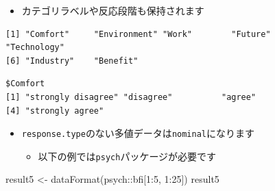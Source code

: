 \documentclass[
  a4paper,
]{ltjsbook}
\newenvironment{Shaded}{\begin{snugshade}}{\end{snugshade}}
\newcommand{\DecValTok}[1]{\textcolor[rgb]{0.68,0.00,0.00}{#1}}
\newcommand{\FunctionTok}[1]{\textcolor[rgb]{0.28,0.35,0.67}{#1}}
\newcommand{\NormalTok}[1]{\textcolor[rgb]{0.00,0.23,0.31}{#1}}
\newcommand{\OtherTok}[1]{\textcolor[rgb]{0.00,0.23,0.31}{#1}}
\newcommand{\SpecialCharTok}[1]{\textcolor[rgb]{0.37,0.37,0.37}{#1}}
\providecommand{\tightlist}{%
  \setlength{\itemsep}{0pt}\setlength{\parskip}{0pt}}\usepackage{longtable,booktabs,array}
\begin{document}
\begin{itemize}
\tightlist
\item
  カテゴリラベルや反応段階も保持されます
\end{itemize}

\begin{Shaded}
\end{Shaded}

\begin{verbatim}
[1] "Comfort"     "Environment" "Work"        "Future"      "Technology" 
[6] "Industry"    "Benefit"    
\end{verbatim}

\begin{Shaded}
\end{Shaded}

\begin{verbatim}
$Comfort
[1] "strongly disagree" "disagree"          "agree"            
[4] "strongly agree"   
\end{verbatim}

\begin{itemize}
\tightlist
\item
  \texttt{response.type}のない多値データは\texttt{nominal}になります

  \begin{itemize}
  \tightlist
  \item
    以下の例では\texttt{psych}パッケージが必要です
  \end{itemize}
\end{itemize}

\begin{Shaded}
\begin{Highlighting}[]
\NormalTok{result5 }\OtherTok{\textless{}{-}} \FunctionTok{dataFormat}\NormalTok{(psych}\SpecialCharTok{::}\NormalTok{bfi[}\DecValTok{1}\SpecialCharTok{:}\DecValTok{5}\NormalTok{, }\DecValTok{1}\SpecialCharTok{:}\DecValTok{25}\NormalTok{])}
\NormalTok{result5}
\end{Highlighting}
\end{Shaded}
\end{document}

